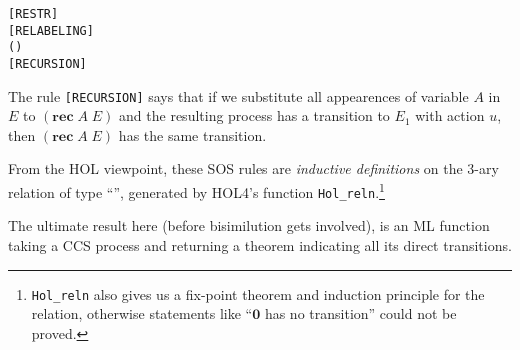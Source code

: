 \begin{alltt}
   \HOLSymConst{\ensuremath{\nu}}   \HOLTokenTransBegin{}\HOLTokenTransEnd \HOLSymConst{\ensuremath{\nu}}  \hfill\texttt{[RESTR]}
\HOLTokenTurnstile{}  \HOLTokenTransBegin{}\HOLTokenTransEnd {} \HOLSymConst{\HOLTokenImp{}}    \HOLTokenTransBegin{}  \HOLTokenTransEnd {}  \hfill\texttt{[RELABELING]}
\HOLTokenTurnstile{}   (  )  \HOLTokenTransBegin{}\HOLTokenTransEnd {} \HOLSymConst{\HOLTokenImp{}}    \HOLTokenTransBegin{}\HOLTokenTransEnd {}
\texttt{[RECURSION]}
\end{alltt}

The rule 
\texttt{[RECURSION]}
 says that if we substitute all appearences of variable $A$ in $E$ to
$(\mathbf{rec}\; A\; E)$ and the resulting process has a transition to $E_1$
with action $u$, then $(\mathbf{rec}\; A\; E)$ has the same
transition. 



From the HOL  viewpoint, these
SOS rules are \emph{inductive 
  definitions} on the 3-ary relation  of type ``'', generated by HOL4's function
\texttt{Hol_reln}.\footnote{\texttt{Hol_reln} also
gives us a fix-point theorem and induction principle for the
relation, otherwise statements like ``$\textbf{0}$ has no transition''
could not be proved.} 



The ultimate result here (before
bisimilution gets involved), is an ML function
  taking a CCS process
and returning a theorem indicating all its direct transitions.


